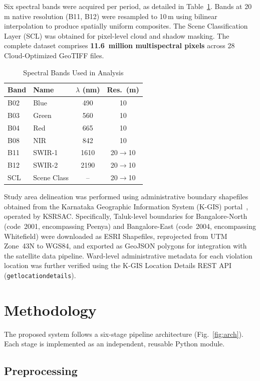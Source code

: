 \documentclass[conference,10pt]{IEEEtran}
\begin{document}
Six spectral bands were acquired per period, as detailed in Table~\ref{tab:bands}. Bands at 20\,m native resolution (B11, B12) were resampled to 10\,m using bilinear interpolation to produce spatially uniform composites. The Scene Classification Layer (SCL) was obtained for pixel-level cloud and shadow masking. The complete dataset comprises \textbf{11.6~million multispectral pixels} across 28 Cloud-Optimized GeoTIFF files.

\begin{table}[h]
\centering
\caption{Spectral Bands Used in Analysis}
\label{tab:bands}
\begin{tabular}{llcc}
\toprule
\textbf{Band} & \textbf{Name} & \textbf{$\lambda$ (nm)} & \textbf{Res.\ (m)} \\
\midrule
B02 & Blue & 490 & 10 \\
B03 & Green & 560 & 10 \\
B04 & Red & 665 & 10 \\
B08 & NIR & 842 & 10 \\
B11 & SWIR-1 & 1610 & 20$\to$10 \\
B12 & SWIR-2 & 2190 & 20$\to$10 \\
SCL & Scene Class & -- & 20$\to$10 \\
\bottomrule
\end{tabular}
\end{table}

Study area delineation was performed using administrative boundary shapefiles obtained from the Karnataka Geographic Information System (K-GIS) portal~\cite{kgis2024}, operated by KSRSAC. Specifically, Taluk-level boundaries for Bangalore-North (code~2001, encompassing Peenya) and Bangalore-East (code~2004, encompassing Whitefield) were downloaded as ESRI Shapefiles, reprojected from UTM Zone~43N to WGS84, and exported as GeoJSON polygons for integration with the satellite data pipeline. Ward-level administrative metadata for each violation location was further verified using the K-GIS Location Details REST API (\texttt{getlocationdetails}).

\section{Methodology}

The proposed system follows a six-stage pipeline architecture (Fig.~\ref{fig:arch}). Each stage is implemented as an independent, reusable Python module.

\subsection{Preprocessing}
\end{document}
